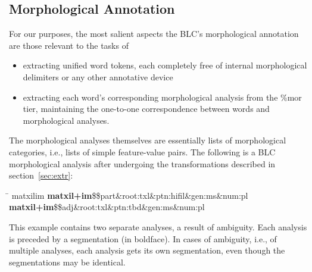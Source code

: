 \subsection{Morphological Annotation}
\label{sec:morph-annotation}
For our purposes, the most salient aspects the BLC's morphological 
annotation are those relevant to the tasks of
\begin{itemize}
\item extracting unified word tokens, each completely free of internal morphological 
delimiters or any other annotative device
\item extracting each word's corresponding morphological analysis from the 
\textsf{\%mor} tier, maintaining the one-to-one
correspondence between words and morphological analyses. 
\end{itemize} %
The morphological analyses themselves are essentially lists of morphological categories, 
i.e., lists of simple feature-value pairs.
The following is a BLC morphological analysis after undergoing the transformations 
described in section~\ref{sec:extr}:
\begin{exe} 
\ex \label{ex:finished}
\begin{tabbing}
\hspace{0.8in} \= \hspace{5.5in} \kill
\textsf{matxilim} \> \textsf{\textbf{matxil+im}\$\$part\&root:txl\&ptn:hifil\&gen:ms\&num:pl}\, \\
\> \textsf{\textbf{matxil+im}\$\$adj\&root:txl\&ptn:tbd\&gen:ms\&num:pl}
\end{tabbing}
\end{exe}
This example contains two separate analyses, a result of ambiguity. 
Each analysis is preceded by a segmentation (in boldface). 
In cases of ambiguity, i.e., of multiple analyses, each analysis gets its own 
segmentation, even though the segmentations may be identical.

